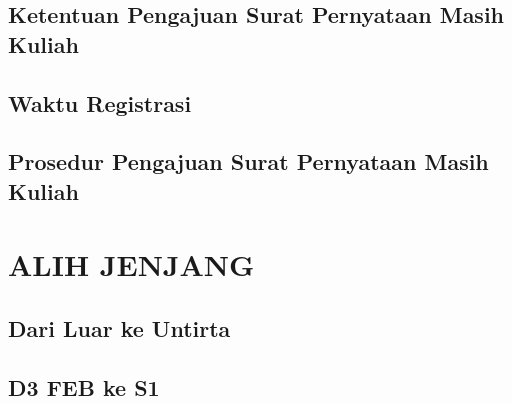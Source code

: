 \documentclass[
]{book}
\begin{document}
\hypertarget{ketentuan-pengajuan-surat-pernyataan-masih-kuliah}{%
\section{Ketentuan Pengajuan Surat Pernyataan Masih Kuliah}\label{ketentuan-pengajuan-surat-pernyataan-masih-kuliah}}

\hypertarget{waktu-registrasi-6}{%
\section{Waktu Registrasi}\label{waktu-registrasi-6}}

\hypertarget{prosedur-pengajuan-surat-pernyataan-masih-kuliah}{%
\section{Prosedur Pengajuan Surat Pernyataan Masih Kuliah}\label{prosedur-pengajuan-surat-pernyataan-masih-kuliah}}

\hypertarget{alih-jenjang}{%
\chapter{ALIH JENJANG}\label{alih-jenjang}}

\hypertarget{dari-luar-ke-untirta}{%
\section{Dari Luar ke Untirta}\label{dari-luar-ke-untirta}}

\hypertarget{d3-feb-ke-s1}{%
\section{D3 FEB ke S1}\label{d3-feb-ke-s1}}

  
\end{document}
